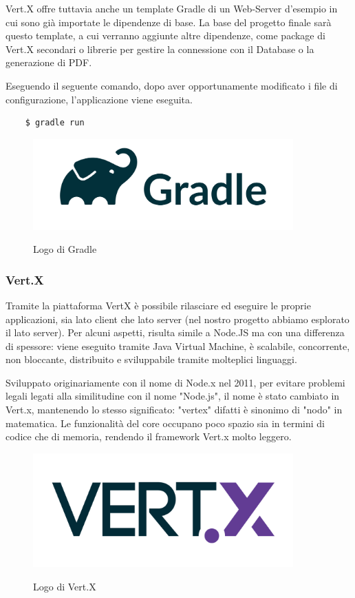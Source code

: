 \noindent Vert.X offre tuttavia anche un template Gradle di un Web-Server d'esempio in cui sono già importate le dipendenze di base.
La base del progetto finale sarà questo template, a cui verranno aggiunte altre dipendenze, come package di Vert.X secondari o librerie per gestire la connessione con il Database o la generazione di PDF.

\noindent Eseguendo il seguente comando, dopo aver opportunamente modificato i file di configurazione, l'applicazione viene eseguita.
\begin{verbatim}
    $ gradle run
\end{verbatim}

\begin{figure}[H]
    \caption{Logo di Gradle}
    \centering
    \includegraphics[width=100mm]{img/gradle_logo.png}
    \label{fig:gradle_logo}
\end{figure}

\subsubsection{Vert.X}
Tramite la piattaforma VertX è possibile rilasciare ed eseguire le proprie applicazioni, sia lato client che lato server (nel nostro progetto abbiamo esplorato il lato server).\newline
Per alcuni aspetti, risulta simile a Node.JS ma con una differenza di spessore: viene eseguito tramite Java Virtual Machine, è scalabile, concorrente, non bloccante, distribuito e sviluppabile tramite molteplici linguaggi.\newline

\noindent Sviluppato originariamente con il nome di Node.x nel 2011, per evitare problemi legali legati alla similitudine con il nome "Node.js", il nome è stato cambiato in Vert.x, mantenendo lo stesso significato: "vertex" difatti è sinonimo di "nodo" in matematica.\newline
Le funzionalità del core occupano poco spazio sia in termini di codice che di memoria, rendendo il framework Vert.x molto leggero.
\begin{figure}[H]
    \caption{Logo di Vert.X}
    \centering
    \includegraphics[width=100mm]{img/vert_x_logo.png}
    \label{fig:vert_x_logo}
\end{figure}


